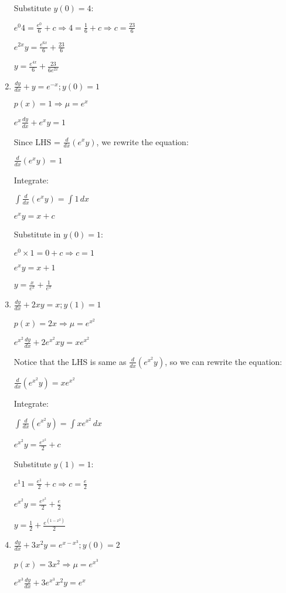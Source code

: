 \documentclass[../main.tex]{subfiles}
\begin{document}
\begin{enumerate}[itemsep=0.7cm]
    Substitute $y(0)=4$:

    $e^{0}4=\frac{e^{0}}{6}+c \Rightarrow 4=\frac{1}{6}+c \Rightarrow c=\frac{23}{6}$

    $e^{2x}y=\frac{e^{6x}}{6}+\frac{23}{6}$

    $y=\frac{e^{4x}}{6}+\frac{23}{6e^{2x}}$


    \item 
    $\frac{dy}{dx}+y=e^{-x}; y(0)=1$

    $p(x)=1 \Rightarrow \mu=e^x$

    $e^x \frac{dy}{dx}+e^x y=1$

    Since LHS = $\frac{d}{dx}(e^x y)$, we rewrite the equation:

    $\frac{d}{dx}(e^x y)=1$

    Integrate:

    $\int \frac{d}{dx}(e^x y)=\int 1\,dx$

    $e^x y=x+c$

    Substitute in $y(0)=1$:

    $e^0 \times 1=0+c \Rightarrow c=1$

    $e^x y = x+1$

    $y=\frac{x}{e^x}+\frac{1}{e^{x}}$

    \item 
    $\frac{dy}{dx}+2xy=x; y(1)=1$

    $p(x)=2x \Rightarrow \mu=e^{x^2}$

    $e^{x^2}\frac{dy}{dx}+2e^{x^2}xy=xe^{x^2}$

    Notice that the LHS is same as $\frac{d}{dx}(e^{x^2}y)$, so we can rewrite the equation:

    $\frac{d}{dx}(e^{x^2}y)=xe^{x^2}$

    Integrate:

    $\int \frac{d}{dx}(e^{x^2}y)=\int xe^{x^2}\,dx$

    $e^{x^2}y=\frac{e^{x^2}}{2}+c$

    Substitute $y(1)=1$:

    $e^{1}1=\frac{e^{1}}{2}+c \Rightarrow c=\frac{e}{2}$

    $e^{x^2}y=\frac{e^{x^2}}{2}+\frac{e}{2}$

    $y=\frac{1}{2}+\frac{e^{(1-x^2)}}{2}$

    \item 
    $\frac{dy}{dx}+3x^2 y=e^{x-x^3}; y(0)=2$

    $p(x)=3x^2 \Rightarrow \mu=e^{x^3}$

    $e^{x^3}\frac{dy}{dx}+3e^{x^3}x^2 y=e^{x}$


\end{enumerate}
\end{document}
